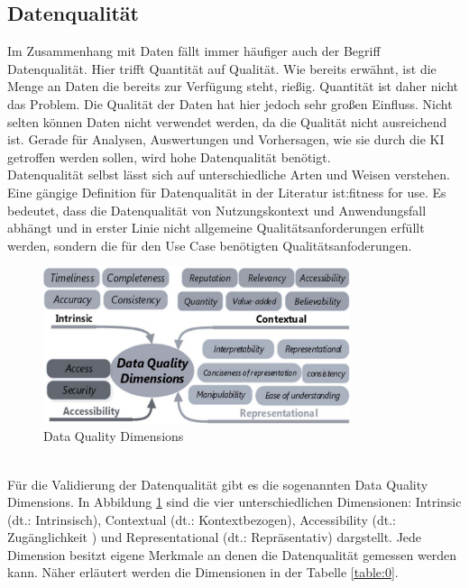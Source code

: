 \begin{onehalfspace}
    \subsection{Datenqualität}
    \label{subsubsec:datenqualität}
        Im Zusammenhang mit Daten fällt immer häufiger auch der Begriff Datenqualität. Hier trifft Quantität auf Qualität. Wie bereits erwähnt, ist die Menge an Daten die bereits zur Verfügung steht, rießig. Quantität ist daher nicht das Problem. Die Qualität der Daten hat hier jedoch sehr großen Einfluss. Nicht selten können Daten nicht verwendet werden, da die Qualität nicht ausreichend ist. Gerade für Analysen, Auswertungen und Vorhersagen, wie sie durch die \ac*{KI} getroffen werden sollen, wird hohe Datenqualität benötigt.\cite{Byabazaire2020}
        \\
        Datenqualität selbst lässt sich auf unterschiedliche Arten und Weisen verstehen.\cite{Yalaoui2021} Eine gängige Definition für Datenqualität in der Literatur ist:\glqq{}fitness for use\grqq{}.\cite{Faroukhi2020} Es bedeutet, dass die Datenqualität von Nutzungskontext und Anwendungsfall abhängt und in erster Linie nicht allgemeine Qualitätsanforderungen erfüllt werden, sondern die für den Use Case benötigten Qualitätsanfoderungen.\cite{Faroukhi2020}\cite{Yalaoui2021}
        \begin{figure}[h]
            \centering
            \includegraphics[width = 9cm]{Bilder/Data_quality_dimensions.png}
            \caption{Data Quality Dimensions \cite{Taleb2018}}
            \label{fig:DataQualityDimensions}
        \end{figure}
        \\
        Für die Validierung der Datenqualität gibt es die sogenannten Data Quality Dimensions. In Abbildung \ref{fig:DataQualityDimensions} sind die vier unterschiedlichen Dimensionen: Intrinsic (\ac{dt}.: Intrinsisch), Contextual (\ac{dt}.: Kontextbezogen), Accessibility (\ac{dt}.: Zugänglichkeit ) und Representational (\ac{dt}.: Repräsentativ) dargstellt. Jede Dimension besitzt eigene Merkmale an denen die Datenqualität gemessen werden kann. Näher erläutert werden die Dimensionen in der Tabelle \ref*{table:0}.

\end{onehalfspace}
